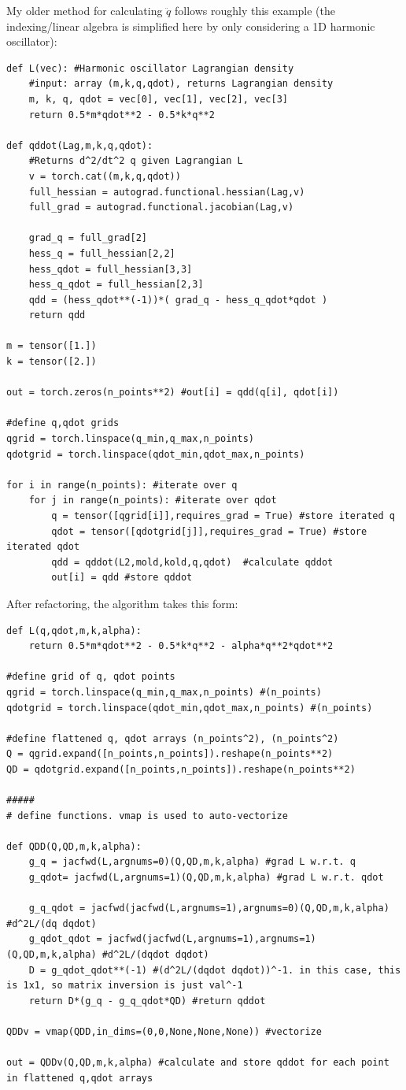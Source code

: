 \documentclass[]{article}
\begin{document}
My older method for calculating $\ddot{q}$ follows roughly this example (the indexing/linear algebra is simplified here by only considering a 1D harmonic oscillator\cite{Taylor2005}):
\begin{lstlisting}
def L(vec): #Harmonic oscillator Lagrangian density
	#input: array (m,k,q,qdot), returns Lagrangian density
	m, k, q, qdot = vec[0], vec[1], vec[2], vec[3]
	return 0.5*m*qdot**2 - 0.5*k*q**2
	
def qddot(Lag,m,k,q,qdot):
	#Returns d^2/dt^2 q given Lagrangian L
	v = torch.cat((m,k,q,qdot))
	full_hessian = autograd.functional.hessian(Lag,v)
	full_grad = autograd.functional.jacobian(Lag,v)
	
	grad_q = full_grad[2]
	hess_q = full_hessian[2,2]
	hess_qdot = full_hessian[3,3]
	hess_q_qdot = full_hessian[2,3]
	qdd = (hess_qdot**(-1))*( grad_q - hess_q_qdot*qdot )
	return qdd
	
m = tensor([1.])
k = tensor([2.])

out = torch.zeros(n_points**2) #out[i] = qdd(q[i], qdot[i])

#define q,qdot grids
qgrid = torch.linspace(q_min,q_max,n_points)
qdotgrid = torch.linspace(qdot_min,qdot_max,n_points)

for i in range(n_points): #iterate over q
	for j in range(n_points): #iterate over qdot
		q = tensor([qgrid[i]],requires_grad = True) #store iterated q
		qdot = tensor([qdotgrid[j]],requires_grad = True) #store iterated qdot
		qdd = qddot(L2,mold,kold,q,qdot)  #calculate qddot
		out[i] = qdd #store qddot
\end{lstlisting}

After refactoring, the algorithm takes this form:
\begin{lstlisting}
def L(q,qdot,m,k,alpha):
	return 0.5*m*qdot**2 - 0.5*k*q**2 - alpha*q**2*qdot**2
	
#define grid of q, qdot points
qgrid = torch.linspace(q_min,q_max,n_points) #(n_points) 
qdotgrid = torch.linspace(qdot_min,qdot_max,n_points) #(n_points)

#define flattened q, qdot arrays (n_points^2), (n_points^2)
Q = qgrid.expand([n_points,n_points]).reshape(n_points**2)
QD = qdotgrid.expand([n_points,n_points]).reshape(n_points**2)

#####
# define functions. vmap is used to auto-vectorize
	
def QDD(Q,QD,m,k,alpha):
	g_q = jacfwd(L,argnums=0)(Q,QD,m,k,alpha) #grad L w.r.t. q
	g_qdot= jacfwd(L,argnums=1)(Q,QD,m,k,alpha) #grad L w.r.t. qdot
	
	g_q_qdot = jacfwd(jacfwd(L,argnums=1),argnums=0)(Q,QD,m,k,alpha) #d^2L/(dq dqdot)
	g_qdot_qdot = jacfwd(jacfwd(L,argnums=1),argnums=1)(Q,QD,m,k,alpha) #d^2L/(dqdot dqdot)
	D = g_qdot_qdot**(-1) #(d^2L/(dqdot dqdot))^-1. in this case, this is 1x1, so matrix inversion is just val^-1
	return D*(g_q - g_q_qdot*QD) #return qddot
	
QDDv = vmap(QDD,in_dims=(0,0,None,None,None)) #vectorize

out = QDDv(Q,QD,m,k,alpha) #calculate and store qddot for each point in flattened q,qdot arrays
\end{lstlisting}
\end{document}
